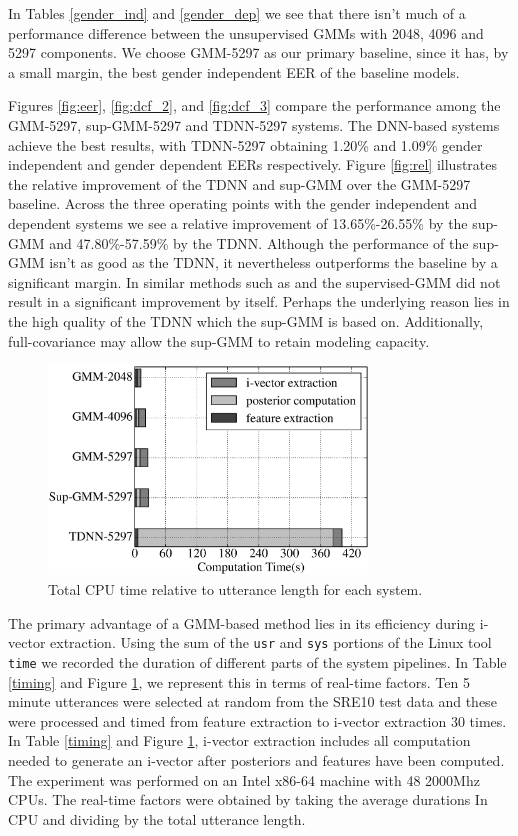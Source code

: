 \documentclass{article}
\begin{document}
In Tables \ref{gender_ind} and \ref{gender_dep} we see that there
isn't much of a performance difference between
the unsupervised GMMs with 2048, 4096 and 5297 components. 
We choose GMM-5297 as our primary baseline, since it has, 
by a small margin,
the best gender independent EER of the baseline models.

Figures \ref{fig:eer}, \ref{fig:dcf_2}, and \ref{fig:dcf_3}
compare the performance among the GMM-5297,
sup-GMM-5297 and TDNN-5297 systems. The DNN-based systems achieve the
best results, with TDNN-5297 obtaining 1.20\% and 1.09\%
gender independent and gender dependent EERs respectively.
Figure \ref{fig:rel} illustrates the relative improvement of the
TDNN and sup-GMM over the GMM-5297 baseline. Across the three
operating points with the gender independent and dependent systems we 
see a relative improvement of 13.65\%-26.55\%
by the sup-GMM and 47.80\%-57.59\% by the TDNN. Although
the performance of the sup-GMM isn't as good as the TDNN,
it nevertheless outperforms the baseline by a significant
margin. In similar methods such as \cite{lei2014} and \cite{omar2010}
the supervised-GMM did not result in a significant improvement by
itself. Perhaps the underlying reason lies in the high quality of
the TDNN which the sup-GMM is based on. Additionally, 
full-covariance may allow the sup-GMM to retain modeling capacity.

\begin{figure}[t]
\centerline{\includegraphics[width=8.5cm]{fig/time}}
\caption{Total CPU time relative to utterance length for each system.}
\label{fig:time}
\end{figure}

The primary advantage of a GMM-based method lies in its
efficiency during i-vector extraction. Using the sum of the \texttt{usr}
and \texttt{sys}
portions of the Linux tool \texttt{time} we recorded the duration of
different parts of the system pipelines. In Table \ref{timing} and
Figure \ref{fig:time}, we represent this in terms of real-time factors.
Ten 5 minute utterances
were selected at random from the SRE10 test data and these were processed
and timed from feature extraction to i-vector extraction 30 times. 
In Table \ref{timing} and
Figure \ref{fig:time}, i-vector extraction
includes all computation needed to generate an i-vector after posteriors and features
have been computed. The experiment was performed on an Intel x86-64 machine with 48 2000Mhz CPUs.
The real-time factors were obtained by taking the average durations In CPU and
dividing by the total utterance length. 
\end{document}
